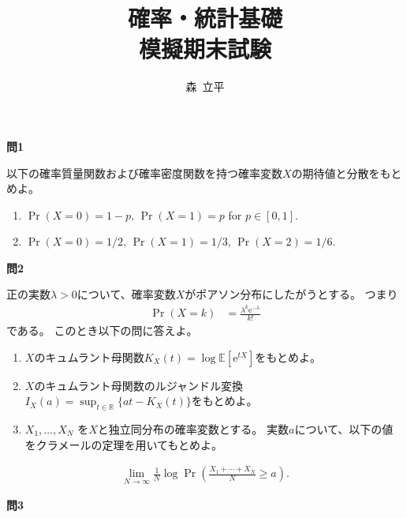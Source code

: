 \documentclass[lualatex,ja=standard,a4paper]{bxjsarticle}
\title{確率・統計基礎\\
模擬期末試験}
\author{森~立平}
\date{}
\theoremstyle{definition}
\theoremstyle{remark}
\begin{document}
\maketitle


\vspace{1em}
{\noindent\large\bfseries 問1}

\vspace{1em}
以下の確率質量関数および確率密度関数を持つ確率変数$X$の期待値と分散をもとめよ。

\vspace{1em}
\begin{enumerate}[label=(\arabic*)]
\setlength{\itemsep}{1em}
\item
$\Pr(X=0)=1-p,\,\Pr(X=1)=p$ for $p\in[0,1]$.
\item
$\Pr(X=0)=1/2,\,\Pr(X=1)=1/3,\,\Pr(X=2)=1/6$.
\end{enumerate}

\vspace{1em}
{\noindent\large\bfseries 問2}

\vspace{1em}
正の実数$\lambda>0$について、確率変数$X$がポアソン分布にしたがうとする。
つまり
\begin{align*}
\Pr(X = k) &=  \frac{\lambda^k\mathrm{e}^{-\lambda}}{k!}
\end{align*}
である。
このとき以下の問に答えよ。
\vspace{1em}
\begin{enumerate}[label=(\arabic*)]
\setlength{\itemsep}{1em}
\item $X$のキュムラント母関数$K_X(t)=\log\mathbb{E}[\mathrm{e}^{tX}]$をもとめよ。
\item $X$のキュムラント母関数のルジャンドル変換$I_X(a) = \sup_{t\in\mathbb{R}}\{at - K_X(t)\}$をもとめよ。
\item $X_1,\dotsc,X_N$ を$X$と独立同分布の確率変数とする。
実数$a$について、以下の値をクラメールの定理を用いてもとめよ。
\end{enumerate}
\begin{align*}
\lim_{N\to\infty}\frac1N\log\Pr\left(\frac{X_1+\dotsb+X_N}{N} \ge a\right).
\end{align*}


\newpage
{\noindent\large\bfseries 問3}
\end{document}
